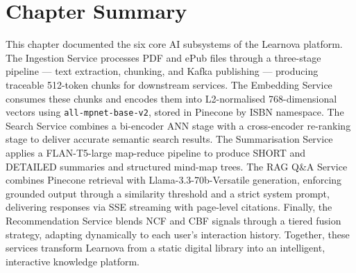 \section*{Chapter Summary}

This chapter documented the six core AI subsystems of the Learnova platform.
The Ingestion Service processes PDF and ePub files through a three-stage
pipeline --- text extraction, chunking, and Kafka publishing --- producing
traceable 512-token chunks for downstream services. The Embedding Service
consumes these chunks and encodes them into L2-normalised 768-dimensional
vectors using \texttt{all-mpnet-base-v2}, stored in Pinecone by ISBN
namespace. The Search Service combines a bi-encoder ANN stage with a
cross-encoder re-ranking stage to deliver accurate semantic search results.
The Summarisation Service applies a FLAN-T5-large map-reduce pipeline to
produce SHORT and DETAILED summaries and structured mind-map trees. The RAG
Q\&A Service combines Pinecone retrieval with Llama-3.3-70b-Versatile
generation, enforcing grounded output through a similarity threshold and a
strict system prompt, delivering responses via SSE streaming with page-level
citations. Finally, the Recommendation Service blends NCF and CBF signals
through a tiered fusion strategy, adapting dynamically to each user's
interaction history. Together, these services transform Learnova from a static
digital library into an intelligent, interactive knowledge platform.